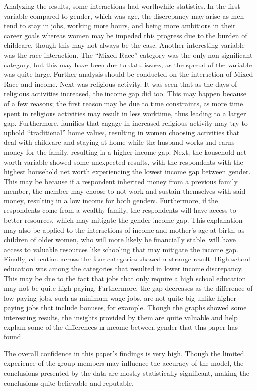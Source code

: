 \documentclass[
]{article}
\begin{document}
Analyzing the results, some interactions had worthwhile statistics. In
the first variable compared to gender, which was age, the discrepancy
may arise as men tend to stay in jobs, working more hours, and being
more ambitious in their career goals whereas women may be impeded this
progress due to the burden of childcare, though this may not always be
the case. Another interesting variable was the race interaction. The
``Mixed Race'' category was the only non-significant category, but this
may have been due to data issues, as the spread of the variable was
quite large. Further analysis should be conducted on the interaction of
Mixed Race and income. Next was religious activity. It was seen that as
the days of religious activities increased, the income gap did too. This
may happen because of a few reasons; the first reason may be due to time
constraints, as more time spent in religious activities may result in
less worktime, thus leading to a larger gap. Furthermore, families that
engage in increased religious activity may try to uphold ``traditional''
home values, resulting in women choosing activities that deal with
childcare and staying at home while the husband works and earns money
for the family, resulting in a higher income gap. Next, the household
net worth variable showed some unexpected results, with the respondents
with the highest household net worth experiencing the lowest income gap
between gender. This may be because if a respondent inherited money from
a previous family member, the member may choose to not work and sustain
themselves with said money, resulting in a low income for both genders.
Furthermore, if the respondents come from a wealthy family, the
respondents will have access to better resources, which may mitigate the
gender income gap. This explanation may also be applied to the
interactions of income and mother's age at birth, as children of older
women, who will more likely be financially stable, will have access to
valuable resources like schooling that may mitigate the income gap.
Finally, education across the four categories showed a strange result.
High school education was among the categories that resulted in lower
income discrepancy. This may be due to the fact that jobs that only
require a high school education may not be quite high paying.
Furthermore, the gap decreases as the difference of low paying jobs,
such as minimum wage jobs, are not quite big unlike higher paying jobs
that include bonuses, for example. Though the graphs showed some
interesting results, the insights provided by them are quite valuable
and help explain some of the differences in income between gender that
this paper has found.

The overall confidence in this paper's findings is very high. Though the
limited experience of the group members may influence the accuracy of
the model, the conclusions presented by the data are mostly
statistically significant, making the conclusions quite believable and
reputable.
\end{document}
